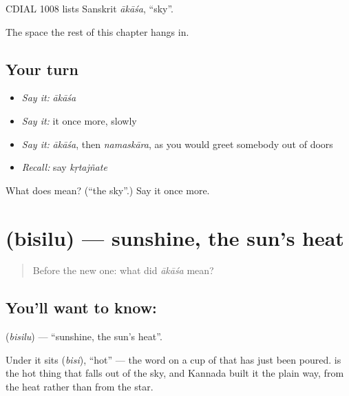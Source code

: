 CDIAL 1008 lists Sanskrit \emph{ākāśa}, \textquotedblleft{}sky\textquotedblright{}.

\begin{grammarlens}[title={What you've built}]
The space the rest of this chapter hangs in.
\end{grammarlens}

\subsection*{Your turn}
\begin{itemize}
\raggedright
  \item \emph{Say it:} \emph{ākāśa}
  \item \emph{Say it:} it once more, slowly
  \item \emph{Say it:} \emph{ākāśa}, then \emph{namaskāra}, as you would greet somebody out of doors
  \item \emph{Recall:} say \emph{kṛtajñate}
\end{itemize}

\begin{tcolorbox}[breakable,colback=teal!4,colframe=teal!35!black,title={Before you move on}]
What does  mean? (\textquotedblleft{}the sky\textquotedblright{}.) Say it once more.
\end{tcolorbox}
\section[\texorpdfstring{\kn{ಬಿಸಿಲು} (bisilu)}{ಬಿಸಿಲು (bisilu)}]{ (bisilu) — sunshine, the sun's heat}

\label{lesson:KA-C53-sunshine}



\begin{quote}
Before the new one: what did \emph{ākāśa} mean?
\end{quote}

\subsection*{You'll want to know: }
\textbf{} (\emph{bisilu}) — \textquotedblleft{}sunshine, the sun's heat\textquotedblright{}.

Under it sits  (\emph{bisi}), \textquotedblleft{}hot\textquotedblright{} — the word on a cup of  that has just been poured.  is the hot thing that falls out of the sky, and Kannada built it the plain way, from the heat rather than from the star.

